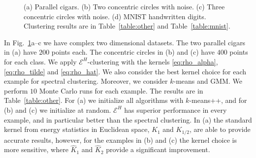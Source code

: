 \documentclass[aps,preprint,nofootinbib,floatfix]{revtex4-1}
\newcommand\kk{K}
\begin{document}
\begin{figure}
\begin{minipage}{0.23\textwidth}
\end{minipage}
\caption{\label{fig:other}
(a) Parallel cigars. (b) Two  
concentric circles with noise. (c) Three
concentric circles with noise. (d) MNIST handwritten digits.
Clustering results are in Table~\ref{table:other}
and Table~\ref{table:mnist}.
}
\end{figure}

In Fig.~\ref{fig:other}a--c we have 
complex two dimensional datasets. The two parallel cigars in (a)
have $200$ points each. The concentric circles
in (b) and (c) have $400$ points for each class.
We apply $\mathcal{E}^H$-clustering  with the 
kernels \eqref{eq:rho_alpha}, \eqref{eq:rho_tilde} and \eqref{eq:rho_hat}. 
We also consider the best kernel choice for each example for spectral
clustering. 
Moreover, we consider
$k$-means and GMM. We perform $10$ Monte Carlo runs for each example.
The results are in Table~\ref{table:other}.
For (a) we initialize
all algorithms with $k$-means++, and for (b) and (c) we initialize at
random.
$\mathcal{E}^H$ has superior performance
in every example, and in particular better than the
spectral clustering.
In (a) 
the standard kernel from energy statistics in Euclidean
space, $\kk_1$ and $\kk_{1/2}$, are
able to provide accurate results, however, for the
examples in (b) and (c) the kernel choice is more sensitive, where
$\widehat{\kk}_1$ and $\widehat{\kk}_2$ provide a significant improvement.
\end{document}

